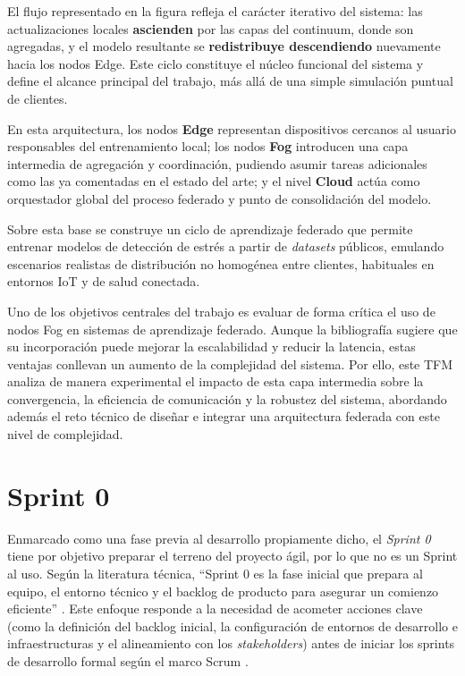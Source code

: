 \documentclass{report}
\begin{document}
El flujo representado en la figura refleja el carácter iterativo del sistema: las actualizaciones locales \textbf{ascienden} por las capas del continuum, donde son agregadas, y el modelo resultante se \textbf{redistribuye descendiendo} nuevamente hacia los nodos Edge. Este ciclo constituye el núcleo funcional del sistema y define el alcance principal del trabajo, más allá de una simple simulación puntual de clientes.

En esta arquitectura, los nodos \textbf{Edge} representan dispositivos cercanos al usuario responsables del entrenamiento local; los nodos \textbf{Fog} introducen una capa intermedia de agregación y coordinación, pudiendo asumir tareas adicionales como las ya comentadas en el estado del arte; y el nivel \textbf{Cloud} actúa como orquestador global del proceso federado y punto de consolidación del modelo.

Sobre esta base se construye un ciclo de aprendizaje federado que permite entrenar modelos de detección de estrés a partir de \textit{datasets} públicos, emulando escenarios realistas de distribución no homogénea entre clientes, habituales en entornos IoT y de salud conectada.

Uno de los objetivos centrales del trabajo es evaluar de forma crítica el uso de nodos Fog en sistemas de aprendizaje federado. Aunque la bibliografía sugiere que su incorporación puede mejorar la escalabilidad y reducir la latencia, estas ventajas conllevan un aumento de la complejidad del sistema. Por ello, este TFM analiza de manera experimental el impacto de esta capa intermedia sobre la convergencia, la eficiencia de comunicación y la robustez del sistema, abordando además el reto técnico de diseñar e integrar una arquitectura federada con este nivel de complejidad.


\section{Sprint 0}

\label{sect:Sp0}
Enmarcado como una fase previa al desarrollo propiamente dicho, el \textit{Sprint 0} tiene por objetivo preparar el terreno del proyecto ágil, por lo que no es un Sprint al uso. 
Según la literatura técnica, “Sprint 0 es la fase inicial que prepara al equipo, el entorno técnico y el backlog de producto para asegurar un comienzo eficiente” \cite{Sprint0_Definition_PMProjectManagement}. 
Este enfoque responde a la necesidad de acometer acciones clave (como la definición del backlog inicial, la configuración de entornos de desarrollo e infraestructuras y el alineamiento con los \textit{stakeholders}) antes de iniciar los sprints de desarrollo formal según el marco Scrum \cite{Sprint0_Definition_MikeCohn}.  
\end{document}
